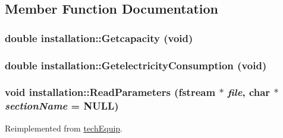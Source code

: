 \subsection{Member Function Documentation}
\hypertarget{classinstallation_ab14206f9458601caac97503ea7455417}{
\subsubsection[{Getcapacity}]{\setlength{\rightskip}{0pt plus 5cm}double installation::Getcapacity (void)}}
\label{classinstallation_ab14206f9458601caac97503ea7455417}
\hypertarget{classinstallation_a8f929f707d39421ac067dcf2ed856990}{
\subsubsection[{GetelectricityConsumption}]{\setlength{\rightskip}{0pt plus 5cm}double installation::GetelectricityConsumption (void)}}
\label{classinstallation_a8f929f707d39421ac067dcf2ed856990}
\hypertarget{classinstallation_ad006ec668a0ec601c610380cffe6e86b}{
\subsubsection[{ReadParameters}]{\setlength{\rightskip}{0pt plus 5cm}void installation::ReadParameters (fstream $\ast$ {\em file}, \/  char $\ast$ {\em sectionName} = {\ttfamily NULL})}}
\label{classinstallation_ad006ec668a0ec601c610380cffe6e86b}


Reimplemented from \hyperlink{classtech_equip_a7b8543a8ead2be2a6a00d80123895e2c}{techEquip}.

